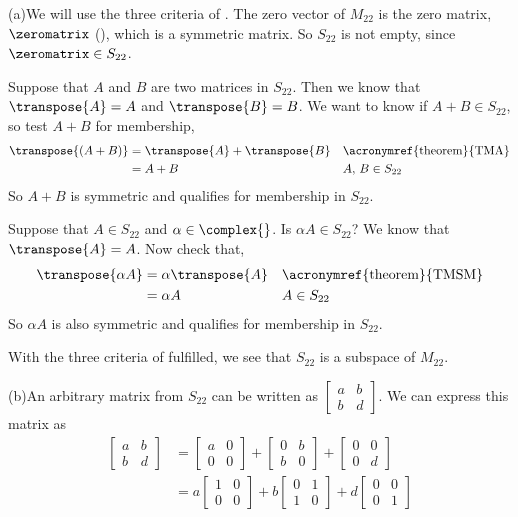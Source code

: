 (a)\quad We will use the three criteria of .  The zero vector of $M_{22}$ is the zero matrix, $\zeromatrix$ (), which is a symmetric matrix.  So $S_{22}$ is not empty, since $\zeromatrix\in S_{22}$.\par
%
Suppose that $A$ and $B$ are two matrices in $S_{22}$.  Then we know that $\transpose{A}=A$ and $\transpose{B}=B$.  We want to know if $A+B\in S_{22}$, so test $A+B$ for membership,
%
\begin{align*}
\transpose{\left(A+B\right)}&=\transpose{A}+\transpose{B}&&\text{\acronymref{theorem}{TMA}}\\
&=A+B&&A,\,B\in S_{22}
\end{align*}
%
So $A+B$ is symmetric and qualifies for membership in $S_{22}$.\par
%
Suppose that $A\in S_{22}$ and $\alpha\in\complex{\null}$.  Is $\alpha A\in S_{22}$?  We know that $\transpose{A}=A$.  Now check that,
%
\begin{align*}
\transpose{\alpha A}&=\alpha\transpose{A}&&\text{\acronymref{theorem}{TMSM}}\\
&=\alpha A&&A\in S_{22}
\end{align*}
%
So $\alpha A$ is also symmetric and qualifies for membership in $S_{22}$.\par
%
With the three criteria of  fulfilled, we see that $S_{22}$ is a subspace of $M_{22}$.\par
%
(b)\quad An arbitrary matrix from $S_{22}$ can be written as 
$\begin{bmatrix}
a&b\\b&d
\end{bmatrix}$.
We can express this matrix as
%
\begin{align*}
%
\begin{bmatrix}
a&b\\b&d
\end{bmatrix}
&=
\begin{bmatrix}
a&0\\0&0
\end{bmatrix}+
%
\begin{bmatrix}
0&b\\b&0
\end{bmatrix}+
%
\begin{bmatrix}
0&0\\0&d
\end{bmatrix}\\
%
&=
a
\begin{bmatrix}
1&0\\0&0
\end{bmatrix}+
b
\begin{bmatrix}
0&1\\1&0
\end{bmatrix}+
d
\begin{bmatrix}
0&0\\0&1
\end{bmatrix}
%
\end{align*}
